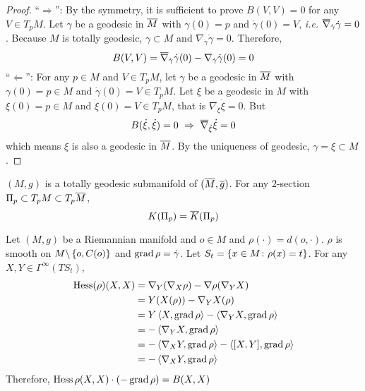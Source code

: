 \begin{enumerate}[label=\arabic{*}.]
\begin{proof}
		``$\Rightarrow$'': By the symmetry, it is sufficient to prove $B(V,V) = 0$ for any $V \in T_pM$. Let $\gamma$ be a geodesic in $\overline{M}$ with $\gamma(0) = p$ and $\dot{\gamma}(0) = V$, \emph{i.e.} $\overline{\nabla}_{\dot{\gamma}}\dot{\gamma} = 0$. Because $M$ is totally geodesic, $\gamma \subset M$ and ${\nabla}_{\dot{\gamma}}\dot{\gamma} = 0$. Therefore,
		\begin{equation*}
			B(V,V) = \overline{\nabla}_{\dot{\gamma}}\dot{\gamma}(0) - {\nabla}_{\dot{\gamma}}\dot{\gamma}(0) = 0
		\end{equation*}
		``$\Leftarrow$'': For any $p \in M$ and $V \in T_pM$, let $\gamma$ be a geodesic in $\overline{M}$ with $\gamma(0) = p \in M$ and $\dot{\gamma}(0) = V \in T_pM$. Let $\xi$ be a geodesic in $M$ with $\xi(0) = p \in M$ and $\dot{\xi}(0) = V \in T_pM$, that is $\nabla_{\dot{\xi}}\dot{\xi} = 0$. But
		\begin{equation*}
			B(\dot{\xi},\dot{\xi}) = 0~\Rightarrow~\overline{\nabla}_{\dot{\xi}}\dot{\xi} = 0
		\end{equation*}
		which means $\xi$ is also a geodesic in $\overline{M}$. By the uniqueness of geodesic, $\gamma = \xi \subset M$.
	\end{proof}
	
	\begin{cor}
		$(M,g)$ is a totally geodesic submanifold of $(\overline{M},\overline{g})$. For any $2$-section $\Pi_p \subset T_pM \subset T_p\overline{M}$,
		\begin{equation*}
			K(\Pi_p) = \overline{K}(\Pi_p)
		\end{equation*}
	\end{cor}
	\begin{exam}
		Let $(M,g)$ be a Riemannian manifold and $o \in M$ and $\rho(\cdot) = d(o,\cdot)$. $\rho$ is smooth on $M \backslash \left\{o,C(o)\right\}$ and $\operatorname{grad}\rho = \dot{\gamma}$. Let $S_t = \left\{x \in M \colon \rho(x) = t\right\}$. For any $X,Y \in \Gamma^\infty(TS_t)$,
		\begin{equation*}
			\begin{aligned}
				\operatorname{Hess}(\rho)(X,X) &= \nabla_Y(\nabla_X\rho) - \nabla\rho(\nabla_YX)\\
				&= Y(X(\rho)) - \nabla_YX(\rho) \\
				&= Y\left\langle X,\operatorname{grad}\rho \right\rangle - \left\langle \nabla_YX,\operatorname{grad}\rho \right\rangle \\
				&= - \left\langle \nabla_YX,\operatorname{grad}\rho \right\rangle \\
				&= -\left\langle \nabla_XY,\operatorname{grad}\rho \right\rangle - \left\langle [X,Y],\operatorname{grad}\rho \right\rangle\\
				&= -\left\langle \nabla_XY,\operatorname{grad}\rho \right\rangle
			\end{aligned}
		\end{equation*}
		Therefore, $\operatorname{Hess}\rho(X,X) \cdot (-\operatorname{grad}\rho) = B(X,X)$
	\end{exam}


\end{enumerate}
